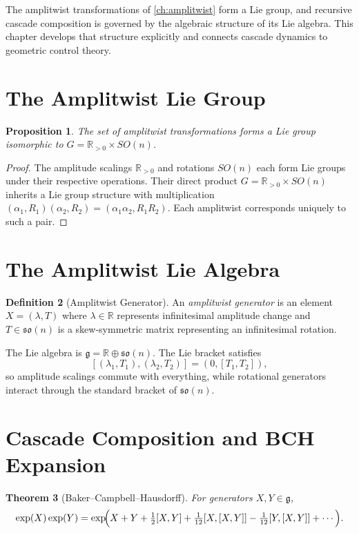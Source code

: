 \documentclass[12pt,a4paper,oneside]{book}
\numberwithin{equation}{chapter}
\theoremstyle{plain}
\newtheorem{theorem}{Theorem}[chapter]
\newtheorem{proposition}[theorem]{Proposition}
\theoremstyle{definition}
\newtheorem{definition}[theorem]{Definition}
\theoremstyle{remark}
\begin{document}
The amplitwist transformations of \cref{ch:amplitwist} form a Lie
group, and recursive cascade composition is governed by the algebraic
structure of its Lie algebra. This chapter develops that structure
explicitly and connects cascade dynamics to geometric control theory.

\section{The Amplitwist Lie Group}

\begin{proposition}
The set of amplitwist transformations forms a Lie group isomorphic to
$G = \mathbb{R}_{>0} \times SO(n)$.
\end{proposition}

\begin{proof}
The amplitude scalings $\mathbb{R}_{>0}$ and rotations $SO(n)$ each
form Lie groups under their respective operations. Their direct
product $G = \mathbb{R}_{>0} \times SO(n)$ inherits a Lie group
structure with multiplication
$(\alpha_1,R_1)(\alpha_2,R_2) = (\alpha_1\alpha_2, R_1 R_2)$.
Each amplitwist corresponds uniquely to such a pair.
\end{proof}

\section{The Amplitwist Lie Algebra}

\begin{definition}[Amplitwist Generator]
An \emph{amplitwist generator} is an element $X = (\lambda, T)$
where $\lambda \in \mathbb{R}$ represents infinitesimal amplitude
change and $T \in \mathfrak{so}(n)$ is a skew-symmetric matrix
representing an infinitesimal rotation.
\end{definition}

The Lie algebra is $\mathfrak{g} = \mathbb{R} \oplus \mathfrak{so}(n)$.
The Lie bracket satisfies
\[
[(\lambda_1, T_1), (\lambda_2, T_2)] = (0, [T_1, T_2]),
\]
so amplitude scalings commute with everything, while rotational
generators interact through the standard bracket of $\mathfrak{so}(n)$.

\section{Cascade Composition and BCH Expansion}

\begin{theorem}[Baker--Campbell--Hausdorff]
For generators $X,Y \in \mathfrak{g}$,
\[
\exp(X)\exp(Y) = \exp\!\Bigl(X + Y + \tfrac{1}{2}[X,Y]
+ \tfrac{1}{12}[X,[X,Y]] - \tfrac{1}{12}[Y,[X,Y]] + \cdots\Bigr).
\]
\end{theorem}
\end{document}
